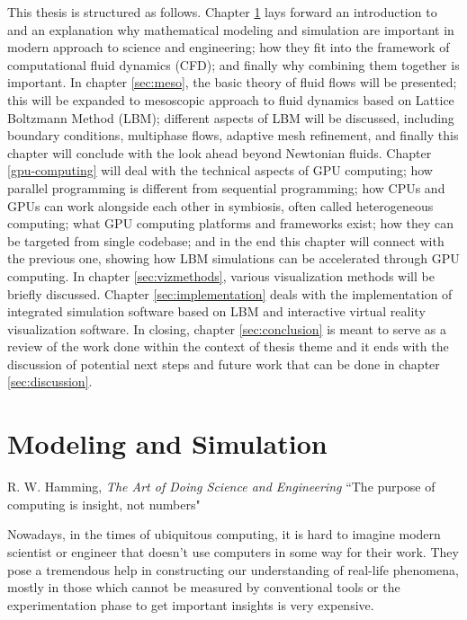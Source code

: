 This thesis is structured as follows. Chapter \ref{sec:modsim} lays forward an introduction to and an explanation why mathematical modeling and simulation are important in modern approach to science and engineering; how they fit into the framework of computational fluid dynamics (CFD); and finally why combining them together is important. In chapter \ref{sec:meso}, the basic theory of fluid flows will be presented; this will be expanded to mesoscopic approach to fluid dynamics based on Lattice Boltzmann Method (LBM); different aspects of LBM will be discussed, including boundary conditions, multiphase flows, adaptive mesh refinement, and finally this chapter will conclude with the look ahead beyond Newtonian fluids. Chapter \ref{gpu-computing} will deal with the technical aspects of GPU computing; how parallel programming is different from sequential programming; how CPUs and GPUs can work alongside each other in symbiosis, often called heterogeneous computing; what GPU computing platforms and frameworks exist; how they can be targeted from single codebase; and in the end this chapter will connect with the previous one, showing how LBM simulations can be accelerated through GPU computing. In chapter \ref{sec:vizmethods}, various visualization methods will be briefly discussed. Chapter \ref{sec:implementation} deals with the implementation of integrated simulation software based on LBM and interactive virtual reality visualization software. In closing, chapter \ref{sec:conclusion} is meant to serve as a review of the work done within the context of thesis theme and it ends with the discussion of potential next steps and future work that can be done in chapter \ref{sec:discussion}.


\section{Modeling and Simulation}\label{sec:modsim}
\begin{chapquote}{R. W. Hamming, \textit{The Art of Doing Science and Engineering}}
``The purpose of computing is insight, not numbers"
\end{chapquote}

Nowadays, in the times of ubiquitous computing, it is hard to imagine modern scientist or engineer that doesn't use computers in some way for their work. They pose a tremendous help in constructing our understanding of real-life phenomena, mostly in those which cannot be measured by conventional tools or the experimentation phase to get important insights is very expensive.

